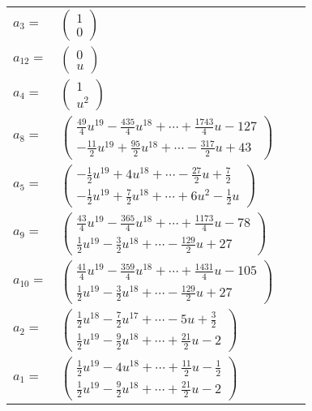 \documentclass[1p]{elsarticle_modified}
\theoremstyle{definition}
\begin{document}
\begin{tabular}{m{7pt} m{180pt} m{7pt} m{180pt} }
\flushright $a_{3}=$&$\begin{pmatrix}1\\0\end{pmatrix}$ \\
\flushright $a_{12}=$&$\begin{pmatrix}0\\u\end{pmatrix}$ \\
\flushright $a_{4}=$&$\begin{pmatrix}1\\u^2\end{pmatrix}$ \\
\flushright $a_{8}=$&$\begin{pmatrix}\frac{49}{4} u^{19}-\frac{435}{4} u^{18}+\cdots+\frac{1743}{4} u-127\\-\frac{11}{2} u^{19}+\frac{95}{2} u^{18}+\cdots-\frac{317}{2} u+43\end{pmatrix}$ \\
\flushright $a_{5}=$&$\begin{pmatrix}-\frac{1}{2} u^{19}+4 u^{18}+\cdots-\frac{27}{2} u+\frac{7}{2}\\-\frac{1}{2} u^{19}+\frac{7}{2} u^{18}+\cdots+6 u^2-\frac{1}{2} u\end{pmatrix}$ \\
\flushright $a_{9}=$&$\begin{pmatrix}\frac{43}{4} u^{19}-\frac{365}{4} u^{18}+\cdots+\frac{1173}{4} u-78\\\frac{1}{2} u^{19}-\frac{3}{2} u^{18}+\cdots-\frac{129}{2} u+27\end{pmatrix}$ \\
\flushright $a_{10}=$&$\begin{pmatrix}\frac{41}{4} u^{19}-\frac{359}{4} u^{18}+\cdots+\frac{1431}{4} u-105\\\frac{1}{2} u^{19}-\frac{3}{2} u^{18}+\cdots-\frac{129}{2} u+27\end{pmatrix}$ \\
\flushright $a_{2}=$&$\begin{pmatrix}\frac{1}{2} u^{18}-\frac{7}{2} u^{17}+\cdots-5 u+\frac{3}{2}\\\frac{1}{2} u^{19}-\frac{9}{2} u^{18}+\cdots+\frac{21}{2} u-2\end{pmatrix}$ \\
\flushright $a_{1}=$&$\begin{pmatrix}\frac{1}{2} u^{19}-4 u^{18}+\cdots+\frac{11}{2} u-\frac{1}{2}\\\frac{1}{2} u^{19}-\frac{9}{2} u^{18}+\cdots+\frac{21}{2} u-2\end{pmatrix}$ \\

\end{tabular}
\end{document}
